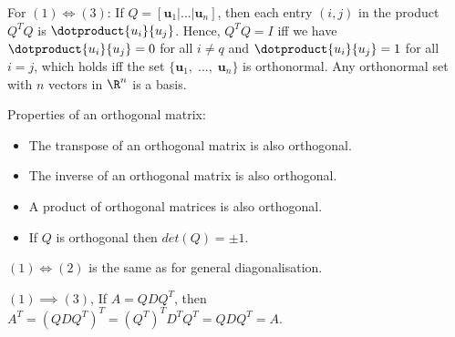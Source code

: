 {For \((1) \iff (3)\): If \(Q = \left[\mathbf{u}_1 | ... | \mathbf{u}_n\right]\), then each entry \((i,j)\) in the product \(Q^TQ\) is \(\dotproduct{u_i}{u_j}\). Hence, \(Q^TQ = I\) iff we have \(\dotproduct{u_i}{u_j} = 0\) for all \(i \neq q\) and \(\dotproduct{u_i}{u_j} = 1\) for all \(i = j\), which holds iff the set \(\{\mathbf{u}_1,\;...,\;\mathbf{u}_n\}\) is orthonormal. Any orthonormal set with \(n\) vectors in \(\R^n\) is a basis.}

Properties of an orthogonal matrix:
\begin{itemize}
    \item The transpose of an orthogonal matrix is also orthogonal.
    \item The inverse of an orthogonal matrix is also orthogonal.
    \item A product of orthogonal matrices is also orthogonal.
    \item If \(Q\) is orthogonal then \(det(Q)=\pm 1\).
\end{itemize}


\newpage\noindent{}
{\((1) \iff (2)\) is the same as for general diagonalisation.

\((1) \implies (3)\), If \(A = QDQ^T\), then \(A^T = (QDQ^T)^T = (Q^T)^TD^TQ^T = QDQ^T = A\).}

